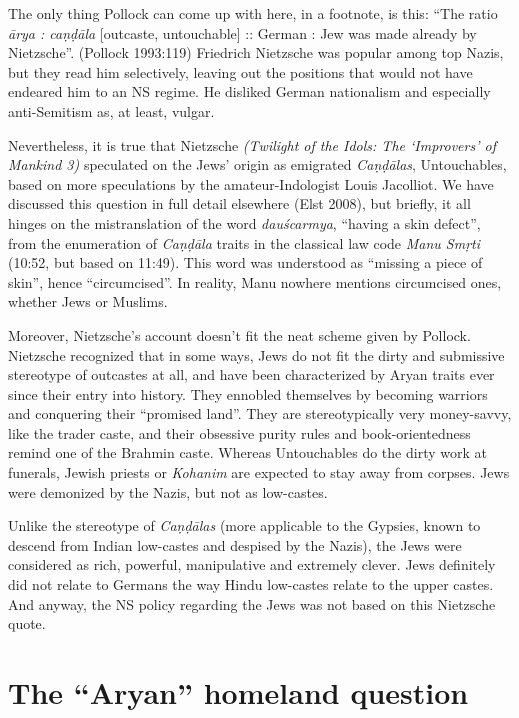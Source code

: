 The only thing Pollock can come up with here, in a footnote, is this: “The ratio {\sl ārya : caṇḍāla} [outcaste, untouchable] :: German : Jew was made already by Nietzsche”. (Pollock 1993:119) Friedrich Nietzsche was popular among top Nazis, but they read him selectively, leaving out the positions that would not have endeared him to an NS regime. He disliked German nationalism and especially anti-Semitism as, at least, vulgar.

Nevertheless, it is true that Nietzsche {\sl (Twilight of the Idols: The ‘Improvers’ of Mankind 3)} speculated on the Jews’ origin as emigrated {\sl Caṇḍālas}, Untouchables, based on more speculations by the amateur-Indologist Louis Jacolliot. We have discussed this question in full detail elsewhere (Elst 2008), but briefly, it all hinges on the mistranslation of the word {\sl dauścarmya}, “having a skin defect”, from the enumeration of {\sl Caṇḍāla} traits in the classical law code {\sl Manu Smṛti} (10:52, but based on 11:49). This word was understood as “missing a piece of skin”, hence “circumcised”. In reality, Manu nowhere mentions circumcised ones, whether Jews or Muslims.

Moreover, Nietzsche’s account doesn’t fit the neat scheme given by Pollock. Nietzsche recognized that in some ways, Jews do not fit the dirty and submissive stereotype of outcastes at all, and have been characterized by Aryan traits ever since their entry into history. They ennobled themselves by becoming warriors and conquering their “promised land”. They are stereotypically very money-savvy, like the trader caste, and their obsessive purity rules and book-orientedness remind one of the Brahmin caste. Whereas Untouchables do the dirty work at funerals, Jewish priests or {\sl Kohanim} are expected to stay away from corpses. Jews were demonized by the Nazis, but not as low-castes.

Unlike the stereotype of {\sl Caṇḍālas} (more applicable to the Gypsies, known to descend from Indian low-castes and despised by the Nazis), the Jews were considered as rich, powerful, manipulative and extremely clever. Jews definitely did not relate to Germans the way Hindu low-castes relate to the upper castes. And anyway, the NS policy regarding the Jews was not based on this Nietzsche quote.

\section*{The “Aryan” homeland question}

